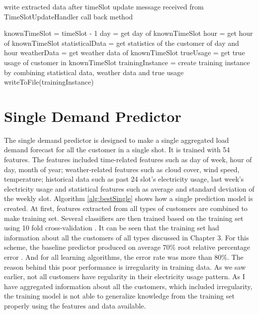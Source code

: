 \begin{algorithm} [!h]
\caption{write extracted data after timeSlot update message received from TimeSlotUpdateHandler call back method}
\begin{algorithmic} [1]
\STATE knownTimeSlot = timeSlot - 1
\STATE day = get day of knownTimeSlot
\STATE hour = get hour of knownTimeSlot
\STATE statisticalData = get statistics of the customer of day and hour
\STATE weatherData = get weather data of knownTimeSlot
\STATE trueUsage = get true usage of customer in knownTimeSlot
\STATE trainingInstance = create training instance by combining statistical data, weather data and true usage 
\STATE writeToFile(trainingInstance)
\ENDFOR
\end{algorithmic}
\label{alg:writeSlotInfo}
\end{algorithm}

\section{Single Demand Predictor}
The single demand predictor is designed to make a single aggregated load demand forecast for all the customer in a single shot. It is trained with 54 features. The features included time-related features such as day of week, hour of day, month of year; weather-related features such as cloud cover, wind speed, temperature; historical data such as past 24 slot's electricity usage, last week's electricity usage and statistical features such as average and standard deviation of the weekly slot. Algorithm \ref{alg:bestSingle} shows how a single prediction model is created. At first, features extracted from all types of customers are combined to make training set. Several classifiers are then trained based on the training set using 10 fold cross-validation \cite{witten2005data}. It can be seen that the training set had information about all the customers of all types discussed in Chapter 3. For this scheme, the baseline predictor produced on average 70\% root relative percentage error \cite{witten2005data}. And for all learning algorithms, the error rate was more than 80\%. The reason behind this poor performance is irregularity in training data. As we saw earlier, not all customers have regularity in their electricity usage pattern. As I have aggregated information about all the customers, which included irregularity, the training model is not able to generalize knowledge from the training set properly using the features and data available. 



